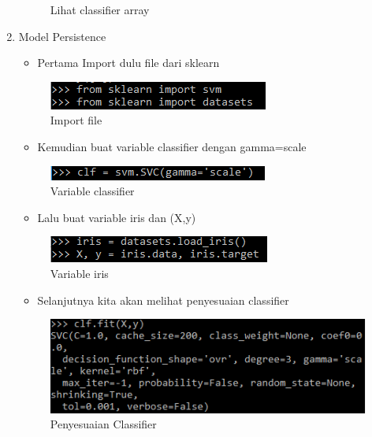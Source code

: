 \begin{enumerate}
\begin{figure}[ht]
\caption{Lihat classifier array}
\label{Classifier Array}
\end{figure}
\item Model Persistence
\begin{itemize}
\item Pertama Import dulu file dari sklearn
\end{itemize}
\begin{figure}[ht]
\centering
\includegraphics[scale=0.7]{figures/2_5.png}
\caption{Import file}
\end{figure}
\begin{itemize}
\item Kemudian buat variable classifier dengan gamma=scale
\end{itemize}
\begin{figure}[ht]
\centering
\includegraphics[scale=0.9]{figures/2_6.png}
\caption{Variable classifier}
\end{figure}
\begin{itemize}
\item Lalu buat variable iris dan (X,y)
\end{itemize}
\begin{figure}[ht]
\centering\includegraphics[scale=0.9]{figures/2_7.png}
\caption{Variable iris}
\end{figure}
\begin{itemize}
\item Selanjutnya kita akan melihat penyesuaian classifier
\end{itemize}
\begin{figure}[ht]
\centering
\includegraphics[scale=0.7]{figures/2_8.png}
\caption{Penyesuaian Classifier}
\end{figure}
\begin{itemize}

\end{itemize}
\end{enumerate}
